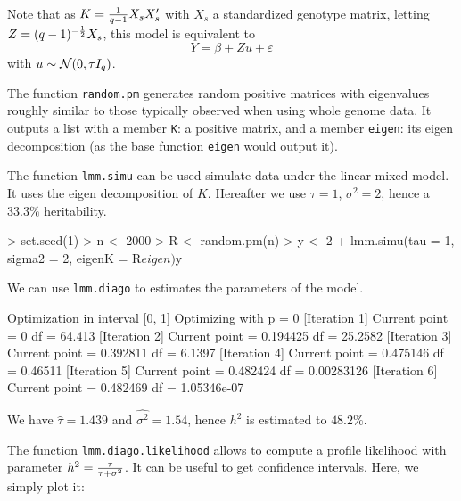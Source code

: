 \documentclass{article}
\let\epsilon\varepsilon
\renewenvironment{Schunk}{\vspace{\topsep}}{\vspace{\topsep}}
\begin{document}
  Note that as $K = {1\over q-1} X_sX_s'$ with $X_s$ a standardized genotype matrix, 
  letting $Z = (q-1)^{-{1 \over 2}} X_s$, this model is equivalent to 
  \begin{equation*}
  Y = \beta + Zu + \epsilon
  \end{equation*}
  with $u \sim \mathcal{N}(0,\tau I_q)$.

  The function \verb!random.pm! generates random positive matrices with eigenvalues
  roughly similar to those typically observed when using whole genome data. It outputs a list
  with a member \verb!K!: a positive matrix, and a member \verb!eigen!: its eigen 
  decomposition (as the base function \verb!eigen! would output it).

  The function \verb!lmm.simu! can be used simulate data under the linear mixed model.
  It uses the eigen decomposition of $K$. Hereafter we use $\tau = 1$, $\sigma^2 = 2$,
  hence a $33.3\%$ heritability.

\begin{Schunk}
\begin{Sinput}
> set.seed(1)
> n <- 2000
> R <- random.pm(n)
> y <- 2 + lmm.simu(tau = 1, sigma2 = 2, eigenK = R$eigen)$y
\end{Sinput}
\end{Schunk}

  We can use \verb!lmm.diago! to estimates the parameters of the model.

\begin{Schunk}
\begin{Soutput}
Optimization in interval [0, 1]
Optimizing with p = 0
[Iteration 1] Current point = 0 df = 64.413
[Iteration 2] Current point = 0.194425 df = 25.2582
[Iteration 3] Current point = 0.392811 df = 6.1397
[Iteration 4] Current point = 0.475146 df = 0.46511
[Iteration 5] Current point = 0.482424 df = 0.00283126
[Iteration 6] Current point = 0.482469 df = 1.05346e-07
\end{Soutput}
\end{Schunk}

  We have $\widehat\tau = 1.439$ and $ = 1.54$,
  hence $h^2$ is estimated to $48.2\%$.

  The function \verb!lmm.diago.likelihood! allows to compute a profile likelihood with parameter 
  $h^2 = {\tau \over \tau + \sigma^2}$. It can be useful to get confidence intervals. Here,
  we simply plot it:
\end{document}
